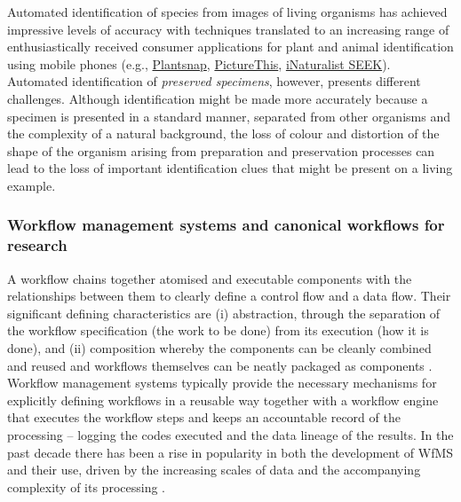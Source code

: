 Automated identification of species from images of living organisms has
achieved impressive levels of accuracy 
\cite{ch8-36,ch8-37,ch8-38,ch8-39,ch8-40,ch8-41} with techniques
translated to an increasing range of enthusiastically received consumer
applications for plant and animal identification using mobile phones
(e.g., \href{https://www.plantsnap.com/}{Plantsnap},
\href{https://www.picturethisai.com/}{PictureThis},
\href{https://www.inaturalist.org/pages/seek_app}{iNaturalist SEEK}).
Automated identification of \emph{preserved specimens}, however,
presents different challenges. Although identification might be made
more accurately because a specimen is presented in a standard manner,
separated from other organisms and the complexity of a natural
background, the loss of colour and distortion of the shape of the
organism arising from preparation and preservation processes can lead to
the loss of important identification clues that might be present on a
living example.

\subsubsection{Workflow management systems and canonical workflows
for
research}\label{workflow-management-systems-and-canonical-workflows-for-research}

A workflow chains together atomised and executable components with the
relationships between them to clearly define a control flow and a data
flow. Their significant defining characteristics are (i) abstraction,
through the separation of the workflow specification (the work to be
done) from its execution (how it is done), and (ii) composition whereby
the components can be cleanly combined and reused and workflows
themselves can be neatly packaged as components \cite{ch8-42}. Workflow
management systems typically provide the necessary mechanisms for
explicitly defining workflows in a reusable way together with a workflow
engine that executes the workflow steps and keeps an accountable record
of the processing -- logging the codes executed and the data lineage of
the results. In the past decade there has been a rise in popularity in
both the development of WfMS and their use, driven by the increasing
scales of data and the accompanying complexity of its processing
\cite{ch8-42}.

